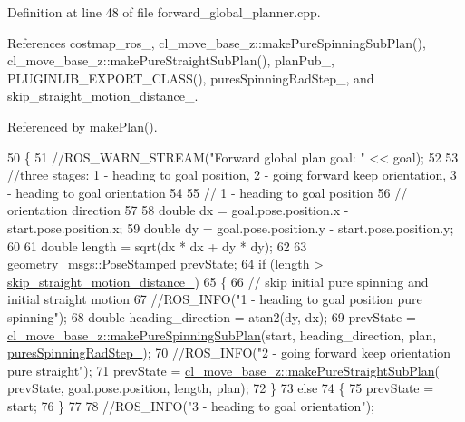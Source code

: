 Definition at line 48 of file forward\+\_\+global\+\_\+planner.\+cpp.



References costmap\+\_\+ros\+\_\+, cl\+\_\+move\+\_\+base\+\_\+z\+::make\+Pure\+Spinning\+Sub\+Plan(), cl\+\_\+move\+\_\+base\+\_\+z\+::make\+Pure\+Straight\+Sub\+Plan(), plan\+Pub\+\_\+, P\+L\+U\+G\+I\+N\+L\+I\+B\+\_\+\+E\+X\+P\+O\+R\+T\+\_\+\+C\+L\+A\+S\+S(), pures\+Spinning\+Rad\+Step\+\_\+, and skip\+\_\+straight\+\_\+motion\+\_\+distance\+\_\+.



Referenced by make\+Plan().


\begin{DoxyCode}
50 \{
51     \textcolor{comment}{//ROS\_WARN\_STREAM("Forward global plan goal: " << goal);}
52 
53     \textcolor{comment}{//three stages: 1 - heading to goal position, 2 - going forward keep orientation, 3 - heading to goal
       orientation}
54 
55     \textcolor{comment}{// 1 - heading to goal position}
56     \textcolor{comment}{// orientation direction}
57 
58     \textcolor{keywordtype}{double} dx = goal.pose.position.x - start.pose.position.x;
59     \textcolor{keywordtype}{double} dy = goal.pose.position.y - start.pose.position.y;
60 
61     \textcolor{keywordtype}{double} length = sqrt(dx * dx + dy * dy);
62 
63     geometry\_msgs::PoseStamped prevState;
64     \textcolor{keywordflow}{if} (length > \hyperlink{classcl__move__base__z_1_1forward__global__planner_1_1ForwardGlobalPlanner_abafd101fa62caf2d74f118a0b4bb948c}{skip\_straight\_motion\_distance\_})
65     \{
66         \textcolor{comment}{// skip initial pure spinning and initial straight motion}
67         \textcolor{comment}{//ROS\_INFO("1 - heading to goal position pure spinning");}
68         \textcolor{keywordtype}{double} heading\_direction = atan2(dy, dx);
69         prevState = \hyperlink{namespacecl__move__base__z_ac774e138510eb7b5e0015be1f7709e19}{cl\_move\_base\_z::makePureSpinningSubPlan}(start, 
      heading\_direction, plan, \hyperlink{classcl__move__base__z_1_1forward__global__planner_1_1ForwardGlobalPlanner_a6aed6f8f6e57a8c5821977814d0b9402}{puresSpinningRadStep\_});
70         \textcolor{comment}{//ROS\_INFO("2 - going forward keep orientation pure straight");}
71         prevState = \hyperlink{namespacecl__move__base__z_a84f0875e9e553c2795894cc9c21b2b3c}{cl\_move\_base\_z::makePureStraightSubPlan}(
      prevState, goal.pose.position, length, plan);
72     \}
73     \textcolor{keywordflow}{else}
74     \{
75         prevState = start;
76     \}
77 
78     \textcolor{comment}{//ROS\_INFO("3 - heading to goal orientation");}

\end{DoxyCode}
